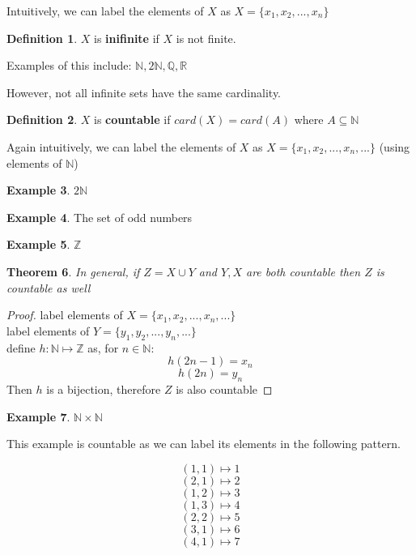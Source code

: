 \documentclass[12pt]{article}
\theoremstyle{plain}
\newtheorem{theorem}{Theorem}[section]
\theoremstyle{definition}
\newtheorem{definition}[theorem]{Definition}
\newtheorem{example}[theorem]{Example}
\begin{document}
Intuitively, we can label the elements of $X$ as $X = \{ x_1, x_2, ..., x_n \}$

\begin{definition}
	$X$ is \textbf{inifinite} if $X$ is not finite.
\end{definition}

Examples of this include: $\mathbb{N}, 2\mathbb{N}, \mathbb{Q}, \mathbb{R}$

However, not all infinite sets have the same cardinality.

\begin{definition}
	$X$ is \textbf{countable} if $card(X) = card(A)$ where $A \subseteq \mathbb{N}$
\end{definition}

Again intuitively, we can label the elements of $X$ as $X = \{ x_1, x_2, ..., x_n, ... \}$ (using elements of $\mathbb{N}$)

\begin{example}
	$2\mathbb{N}$
\end{example}

\begin{example}
	The set of odd numbers
\end{example}

\begin{example}
	$\mathbb{Z}$
\end{example}

\begin{theorem}
	In general, if $Z=X \cup Y$ and $Y,X$ are both countable then $Z$ is countable as well
\end{theorem}

\begin{proof}
	label elements of $X = \{ x_1, x_2, ..., x_n, ... \}$\\
	label elements of $Y = \{ y_1, y_2, ..., y_n, ... \}$\\
	define $h:\mathbb{N}\mapsto \mathbb{Z}$ as, for $n\in\mathbb{N}$:\\
	$$h(2n-1)=x_n$$
	$$h(2n)=y_n$$
	Then $h$ is a bijection, therefore $Z$ is also countable
\end{proof}

\begin{example}
	$\mathbb{N} \times  \mathbb{N}$
\end{example}

This example is countable as we can label its elements in the following pattern.

$$(1,1) \mapsto 1$$
$$(2,1) \mapsto 2$$
$$(1,2) \mapsto 3$$
$$(1,3) \mapsto 4$$
$$(2,2) \mapsto 5$$
$$(3,1) \mapsto 6$$
$$(4,1) \mapsto 7$$
\end{document}
